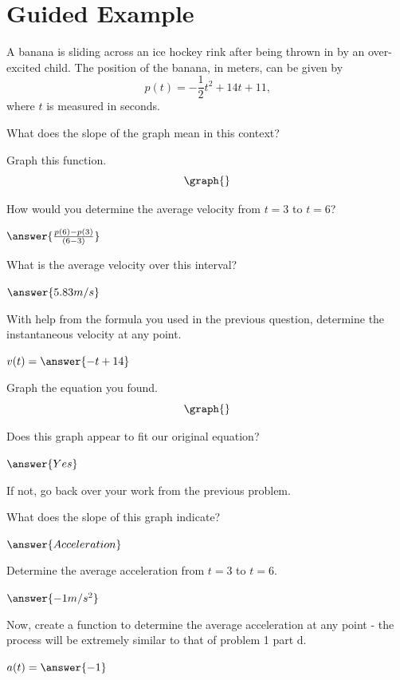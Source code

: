\documentclass{ximera}
\begin{document}
\section{Guided Example}
\begin{question}
A banana is sliding across an ice hockey rink after being thrown in by an over-excited child. The position of the banana, in meters, can be given by $$p(t) = -\dfrac{1}{2}t^2+14t+11\text{,}$$ where $t$ is measured in seconds.

What does the slope of the graph mean in this context?
\begin{freeResponse}
\end{freeResponse}

Graph this function.
\[
    \graph{}
\]

How would you determine the average velocity from $t = 3$ to $t = 6$?

$\answer{\frac{p(6)-p(3)}{(6-3)}}$

What is the average velocity over this interval?

$\answer{5.83 m/s}$

With help from the formula you used in the previous question, determine the instantaneous velocity at any point.

$v(t) =  \answer{-t+14}$


Graph the equation you found.
\[
    \graph{}
\]

Does this graph appear to fit our original equation?

$\answer{Yes}$

If not, go back over your work from the previous problem.


What does the slope of this graph indicate?

$\answer{Acceleration}$

Determine the average acceleration from $t = 3$ to $t = 6$.

$\answer{-1 m/s^2}$

Now, create a function to determine the average acceleration at any point - the process will be extremely similar to that of problem 1 part d.

$a(t) = \answer{-1}$
\end{question}
\end{document}
